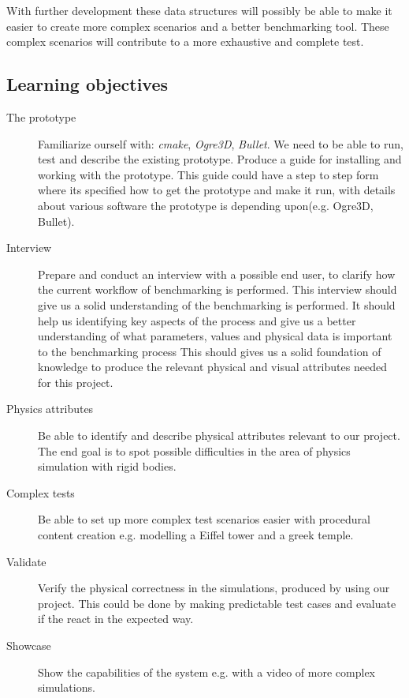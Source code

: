 \documentclass[a4paper, 10pt]{article}
\begin{document}
With further development these data structures will possibly be able to make it easier to create more complex scenarios
and a better benchmarking tool. These complex scenarios will contribute to a more exhaustive and complete test.
\subsection*{Learning objectives}
\begin{description}
\item[The prototype] 	Familiarize ourself with: \emph{cmake}, \emph{Ogre3D}, \emph{Bullet}. 
			We need to be able to run, test and describe the existing prototype.
			Produce a guide for installing and working with the prototype. This guide could have a step to step form
			where its specified how to get the prototype and make it run, with details 
			about various software the prototype is depending upon(e.g. Ogre3D, Bullet). 

\item[Interview] Prepare and conduct an interview with a possible end user, to clarify how the current workflow of benchmarking is performed.
 		This interview should give us a solid understanding of the benchmarking is performed. It should help us
		identifying key aspects of the process and give us a better understanding of what parameters, values and physical data
		is important to the benchmarking process
		 This should gives us a solid foundation of knowledge to produce the relevant physical and visual attributes needed for this project. 
\item[Physics attributes]Be able to identify and describe physical attributes relevant to our project. The end goal is to spot possible difficulties in the
			area of physics simulation with rigid bodies.
\item[Complex tests] Be able to set up more complex test scenarios easier with procedural content creation e.g. modelling a Eiffel tower and a
			greek temple.
\item[Validate] Verify the physical correctness in the simulations, produced by using our project. 
		This could be done by making predictable test cases and evaluate if the react in the expected way. 
\item[Showcase] Show the capabilities of the system e.g. with a video of more complex simulations.
\end{description}
\end{document}
